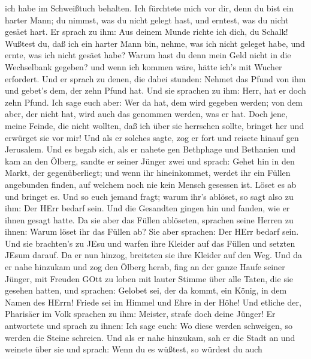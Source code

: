 ich habe im Schweißtuch behalten.  Ich fürchtete mich vor
dir, denn du bist ein harter Mann; du nimmst, was du nicht gelegt hast,
und erntest, was du nicht gesäet hart.  Er sprach zu ihm:
Aus deinem Munde richte ich dich, du Schalk! Wußtest du, daß ich ein
harter Mann bin, nehme, was ich nicht geleget habe, und ernte, was ich
nicht gesäet habe?  Warum hast du denn mein Geld nicht in
die Wechselbank gegeben? und wenn ich kommen wäre, hätte ich's mit
Wucher erfordert.  Und er sprach zu denen, die dabei
stunden: Nehmet das Pfund von ihm und gebet's dem, der zehn Pfund hat.
 Und sie sprachen zu ihm: Herr, hat er doch zehn Pfund.
 Ich sage euch aber: Wer da hat, dem wird gegeben werden;
von dem aber, der nicht hat, wird auch das genommen werden, was er hat.
 Doch jene, meine Feinde, die nicht wollten, daß ich über
sie herrschen sollte, bringet her und erwürget sie vor mir!
 Und als er solches sagte, zog er fort und reisete hinauf
gen Jerusalem.  Und es begab sich, als er nahete gen
Bethphage und Bethanien und kam an den Ölberg, sandte er seiner Jünger
zwei  und sprach: Gehet hin in den Markt, der
gegenüberliegt; und wenn ihr hineinkommet, werdet ihr ein Füllen
angebunden finden, auf welchem noch nie kein Mensch gesessen ist. Löset
es ab und bringet es.  Und so euch jemand fragt; warum
ihr's ablöset, so sagt also zu ihm: Der HErr bedarf sein. 
Und die Gesandten gingen hin und fanden, wie er ihnen gesagt hatte.
 Da sie aber das Füllen ablöseten, sprachen seine Herren zu
ihnen: Warum löset ihr das Füllen ab?  Sie aber sprachen:
Der HErr bedarf sein.  Und sie brachten's zu JEsu und
warfen ihre Kleider auf das Füllen und setzten JEsum darauf.
 Da er nun hinzog, breiteten sie ihre Kleider auf den Weg.
 Und da er nahe hinzukam und zog den Ölberg herab, fing an
der ganze Haufe seiner Jünger, mit Freuden GOtt zu loben mit lauter
Stimme über alle Taten, die sie gesehen hatten,  und
sprachen: Gelobet sei, der da kommt, ein König, in dem Namen des HErrn!
Friede sei im Himmel und Ehre in der Höhe!  Und etliche
der, Pharisäer im Volk sprachen zu ihm: Meister, strafe doch deine
Jünger!  Er antwortete und sprach zu ihnen: Ich sage euch:
Wo diese werden schweigen, so werden die Steine schreien. 
Und als er nahe hinzukam, sah er die Stadt an und weinete über sie
 und sprach: Wenn du es wüßtest, so würdest du auch
